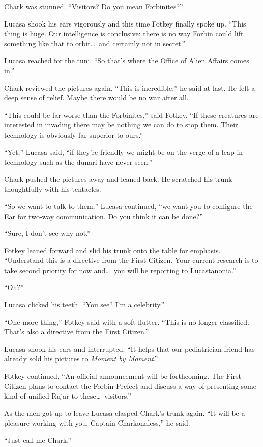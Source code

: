 
Chark was stunned. ``Visitors? Do you mean Forbinites?''

Lucasa shook his ears vigorously and this time Fotkey finally spoke up. ``This thing is huge.
Our intelligence is conclusive: there is no way Forbin could lift something like that to
orbit\ldots\ and certainly not in secret.''

Lucasa reached for the tuni. ``So that's where the Office of Alien Affairs comes in.''

Chark reviewed the pictures again. ``This is incredible,'' he said at last. He felt a deep sense
of relief. Maybe there would be no war after all.

``This could be far worse than the Forbinites,'' said Fotkey. ``If these creatures are
interested in invading there may be nothing we can do to stop them. Their technology is
obviously far superior to ours.''

``Yet,'' Lucasa said, ``if they're friendly we might be on the verge of a leap in technology
such as the dunari have never seen.''

Chark pushed the pictures away and leaned back. He scratched his trunk thoughtfully with his
tentacles.

``So we want to talk to them,'' Lucasa continued, ``we want you to configure the Ear for two-way
communication. Do you think it can be done?''

``Sure, I don't see why not.''

Fotkey leaned forward and slid his trunk onto the table for emphasis. ``Understand this is a
directive from the First Citizen. Your current research is to take second priority for now
and\ldots\ you will be reporting to Lucastanonia.''

``Oh?''

Lucasa clicked his teeth. ``You see? I'm a celebrity.''

``One more thing,'' Fotkey said with a soft flutter. ``This is no longer classified. That's also
a directive from the First Citizen.''

Lucasa shook his ears and interrupted. ``It helps that our pediatrician friend has already sold
his pictures to \textit{Moment by Moment}.''

Fotkey continued, ``An official announcement will be forthcoming. The First Citizen plans to
contact the Forbin Prefect and discuss a way of presenting some kind of unified Rujar to
these\ldots\ visitors.''

As the men got up to leave Lucasa clasped Chark's trunk again. ``It will be a pleasure working
with you, Captain Charkonaless,'' he said.

``Just call me Chark.''
